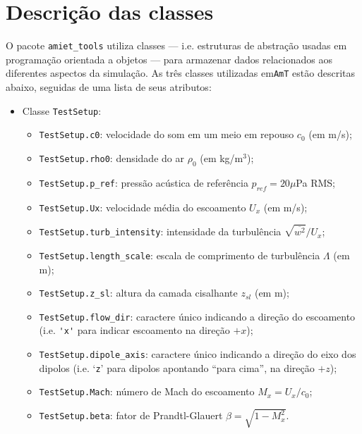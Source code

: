 \documentclass[a4paper, 11pt, twoside]{article}
\newcommand{\AmT}{\texttt{AmT}}
\begin{document}
\clearpage
\newpage

\section{Descrição das classes}
\label{sec:ClassDescription}

O pacote \verb|amiet_tools| utiliza classes --- i.e. estruturas de abstração usadas em programação orientada a objetos --- para armazenar dados relacionados aos diferentes aspectos da simulação. As três classes utilizadas em\AmT{} estão descritas abaixo, seguidas de uma lista de seus atributos:

\begin{itemize}
	\item Classe \verb|TestSetup|:
	\begin{itemize}
		\item \verb|TestSetup.c0|: velocidade do som em um meio em repouso $c_0$ (em m/s);
		\item \verb|TestSetup.rho0|: densidade do ar $\rho_0$ (em kg/m$^3$);
		\item \verb|TestSetup.p_ref|: pressão acústica de referência $p_{ref} = 20 \mu$Pa RMS;
		\item \verb|TestSetup.Ux|: velocidade média do escoamento $U_x$ (em m/s);
		\item \verb|TestSetup.turb_intensity|: intensidade da turbulência $\sqrt{\overline{w^2}}/U_x$;
		\item \verb|TestSetup.length_scale|: escala de comprimento de turbulência $\Lambda$ (em m);
		\item \verb|TestSetup.z_sl|: altura da camada cisalhante $z_{sl}$ (em m);
		\item \verb|TestSetup.flow_dir|: caractere único indicando a direção do escoamento (i.e. \verb|'x'| para indicar escoamento na direção $+x$);
		\item \verb|TestSetup.dipole_axis|: caractere único indicando a direção do eixo dos dipolos (i.e. `\verb|z|' para dipolos apontando ``para cima'', na direção $+z$);
		\item \verb|TestSetup.Mach|: número de Mach do escoamento $M_x = U_x/c_0$;
		\item \verb|TestSetup.beta|: fator de Prandtl-Glauert $\beta = \sqrt{1-M_x^2}$.
	\end{itemize}
	

\end{itemize}
\end{document}
